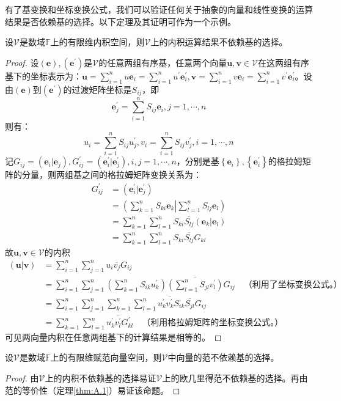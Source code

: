 \documentclass[main.tex]{subfiles}
\begin{document}
有了基变换和坐标变换公式，我们可以验证任何关于抽象的向量和线性变换的运算结果是否依赖基的选择。以下定理及其证明可作为一个示例。

\begin{theorem}\label{thm:II.2.23}
    设$\mathcal{V}$是数域$\mathbb{F}$上的有限维内积空间，则$\mathcal{V}$上的内积运算结果不依赖基的选择。
\end{theorem}
\begin{proof}
    设$\left(\mathbf{e}\right),\left(\mathbf{e}^\prime\right)$是$\mathcal{V}$的任意两组有序基，任意两个向量$\mathbf{u},\mathbf{v}\in\mathcal{V}$在这两组有序基下的坐标表示为：$\mathbf{u}=\sum_{i=1}^nu\mathbf{e}_i=\sum_{i=1}^nu^\prime\mathbf{e}^\prime_i,\mathbf{v}=\sum_{i=1}^nv\mathbf{e}_i=\sum_{i=1}^nv^\prime\mathbf{e}^\prime_i$。设由$\left(\mathbf{e}\right)$到$\left(\mathbf{e}^\prime\right)$的过渡矩阵坐标是$S_{ij}$，即
    \[
        \mathbf{e}_j^\prime=\sum_{i=1}^nS_{ij}\mathbf{e}_i,j=1,\cdots,n\]
    则有：
    \[u_i=\sum_{i=1}^nS_{ij}u^\prime_j,v_i=\sum_{i=1}^nS_{ij}v^\prime_j,i=1,\cdots,n\]
    记$G_{ij}=\left(\mathbf{e}_i|\mathbf{e}_j\right),G_{ij}^\prime=\left(\mathbf{e}^\prime_i|\mathbf{e}^\prime_j\right),i,j=1,\cdots,n$，分别是基$\left\{\mathbf{e}_i\right\},\left\{\mathbf{e}^\prime_i\right\}$的格拉姆矩阵的分量，则两组基之间的格拉姆矩阵变换关系为：
    \begin{align*}
        G^\prime_{ij} & =\left(\mathbf{e}^\prime_i|\mathbf{e}^\prime_j\right)                                     \\
                      & =\left(\sum_{k=1}^n S_{ki}\mathbf{e}_k\right|\left.\sum_{l=1}^n S_{lj}\mathbf{e}_l\right) \\
                      & =\sum_{k=1}^n\sum_{l=1}^nS_{ki}\overline{S_{lj}}\left(\mathbf{e}_k|\mathbf{e}_l\right)    \\
                      & =\sum_{k=1}^n\sum_{l=1}^nS_{ki}\overline{S_{lj}}G_{kl}
    \end{align*}
    故$\mathbf{u},\mathbf{v}\in\mathcal{V}$的内积
    \begin{align*}
        \left(\mathbf{u}|\mathbf{v}\right) & =\sum_{i=1}^n\sum_{j=1}^nu_i\overline{v_j}G_{ij}                                                                                                     \\
                                           & =\sum_{i=1}^n\sum_{j=1}^n\left(\sum_{k=1}^nS_{ik}u_k^\prime\right)\overline{\left(\sum_{l=1}^nS_{jl}v_l^\prime\right)}G_{ij}\quad\text{（利用了坐标变换公式。）} \\
                                           & =\sum_{i=1}^n\sum_{j=1}^n\sum_{k=1}^n\sum_{l=1}^nu_k^\prime\overline{v_k^\prime}S_{ik}\overline{S_{jl}}G_{ij}                                        \\
                                           & =\sum_{k=1}^n\sum_{l=1}^nu_k^\prime\overline{v_l^\prime}G_{kl}^\prime\quad\text{（利用格拉姆矩阵的坐标变换公式。）}
    \end{align*}
    可见两向量内积在任意两组基下的计算结果是相等的。
\end{proof}
\begin{corollary}
    设$\mathcal{V}$是数域$\mathbb{F}$上的有限维赋范向量空间，则$\mathcal{V}$中向量的范不依赖基的选择。
\end{corollary}
\begin{proof}
    由$\mathcal{V}$上的内积不依赖基的选择易证$\mathcal{V}$上的欧几里得范不依赖基的选择。再由范的等价性（定理\ref{thm:A.1}）易证该命题。
\end{proof}
\end{document}
